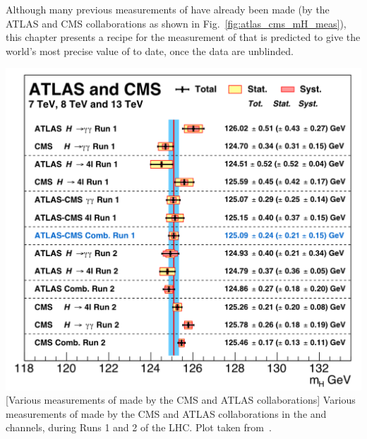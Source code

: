 Although many previous measurements of \mH have already been made (\eg by the ATLAS and CMS collaborations as shown in Fig.~\ref{fig:atlas_cms_mH_meas}), this chapter presents a recipe for the measurement of \mH that is predicted to give the world's most precise value of \mH to date, once the data are unblinded.
\begin{multiFigure}
    \centering
        \includegraphics[width=\textwidth,keepaspectratio]{figures/higgsmassmeas/all_mH_measurements_atlas_cms.png}
        [Various measurements of \mH made by the CMS and ATLAS collaborations]
        {Various measurements of \mH made by the CMS and ATLAS collaborations in the \htoyy and \hzzfourl channels, during Runs 1 and 2 of the LHC.
        Plot taken from~\cite{particle_data_group_review_2020}.}
    \label{fig:atlas_cms_mH_meas}
\end{multiFigure}

